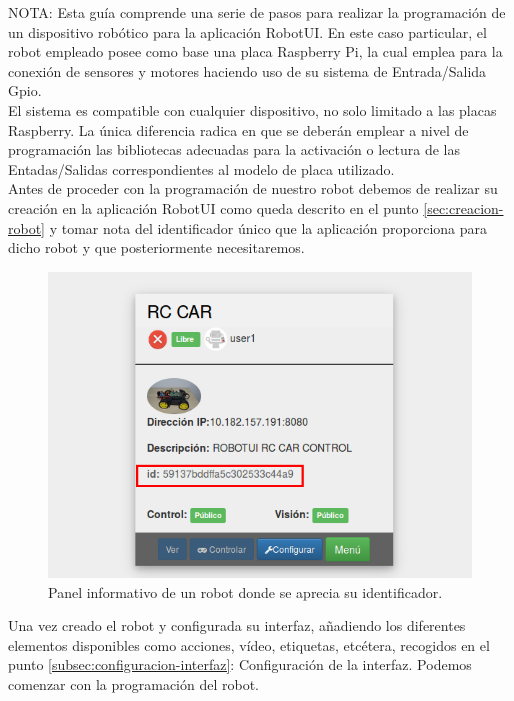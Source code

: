 NOTA: Esta guía comprende una serie de pasos para realizar la programación de un dispositivo robótico para la aplicación RobotUI. En este caso particular, el robot empleado posee como base una placa 
Raspberry Pi, la cual emplea para la conexión de sensores y motores haciendo uso de su sistema de Entrada/Salida Gpio.\\

El sistema es compatible con cualquier dispositivo, no solo limitado a las placas Raspberry. La única diferencia radica en que se deberán emplear a nivel de programación las bibliotecas adecuadas 
para la activación o lectura de las Entadas/Salidas correspondientes al modelo de placa utilizado.\\

Antes de proceder con la programación de nuestro robot debemos de realizar su creación en la aplicación RobotUI como queda descrito en el punto \ref{sec:creacion-robot} y 
tomar nota del identificador único que la aplicación proporciona para dicho robot y que posteriormente necesitaremos.\\	

\begin{figure}[H]
  \begin{center}
    \includegraphics[scale=.6]{imagenes/manual-usuario/identificador.png}
  \end{center}
  \caption{Panel informativo de un robot donde se aprecia su identificador.}
  \label{website:pagina-principal}
\end{figure}

Una vez creado el robot y configurada su interfaz, añadiendo los diferentes elementos disponibles como acciones, vídeo, etiquetas, etcétera, recogidos en el punto \ref{subsec:configuracion-interfaz}: Configuración de la interfaz.
Podemos comenzar con la programación del robot.\\

